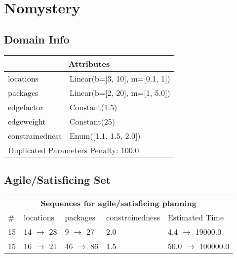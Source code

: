 \documentclass{article}
\begin{document}
                            \newpage \section{Nomystery}
                    \subsection*{Domain Info}

                    \begin{center}
                    \begin{tabular}{p{}p{}}
                    \multicolumn{2}{c}{\bf \large Attributes}\\\midrule
                    locations & Linear(b=[3, 10], m=[0.1, 1])\\
packages & Linear(b=[2, 20], m=[1, 5.0])\\
edgefactor & Constant(1.5)\\
edgeweight & Constant(25)\\
constrainedness & Enum([1.1, 1.5, 2.0])
                    
                     \\\midrule
                    \multicolumn{2}{l}{Duplicated Parameters Penalty: 100.0}
                    \end{tabular}
                    \end{center}
                
                         \subsection*{Agile/Satisficing Set}

                        \begin{center}
                        \begin{tabular}{l|l|l|l|l}
                        \multicolumn{5}{c}{\bf \large Sequences for agile/satisficing planning}\\
                        \# & locations & packages & constrainedness & Estimated Time\\\midrule
                        15&14 $\rightarrow$ 28&9 $\rightarrow$ 27&2.0&4.4 $\rightarrow$ 19000.0\\
15&16 $\rightarrow$ 21&46 $\rightarrow$ 86&1.5&50.0 $\rightarrow$ 100000.0
                        \end{tabular}
                        \end{center}
                    
\end{document}
